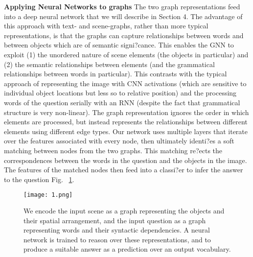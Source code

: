 \documentclass[a4paper,twocolumn]{article}
\begin{document}
\textbf{Applying Neural Networks to graphs}
 The two graph representations feed into a deep neural network that we will describe in Section 4. The advantage of this approach with text- and scene-graphs, rather than more typical representations, is that the graphs can capture relationships between words and between objects which are of semantic signi?cance. This enables the GNN to exploit (1) the unordered nature of scene elements (the objects in particular)
and (2) the semantic relationships between elements (and the grammatical relationships between words in particular). This contrasts with the typical approach of representing the image with CNN activations (which are sensitive to individual object locations but less so to relative position) and the processing words of the question serially with an RNN (despite the fact that grammatical structure is very non-linear). The graph representation ignores the order in which elements are processed, but instead represents the relationships between different elements using different edge types. Our network uses multiple layers that iterate over the features associated with every node, then ultimately identi?es a soft matching between nodes from the two graphs. This matching re?ects the correspondences between the words in the question and the objects in the image. The features of the matched nodes then feed into a classi?er to infer the answer to the question Fig. ~\ref{fig1}.

  \begin{figure}[htbp]
  \centering
  \texttt{[image: 1.png]}
  \caption{ We encode the input scene as a graph representing the objects and their spatial arrangement, and the input question as a graph representing words and their syntactic dependencies. A neural network is trained to reason over these representations, and to produce a suitable answer as a prediction over an output vocabulary.}
  \label{fig1}
  \end{figure}

  
  
\end{document}
